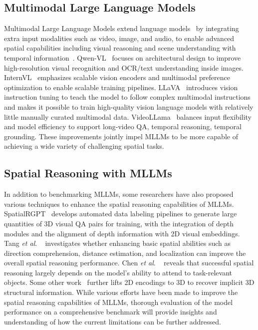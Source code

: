\documentclass{article}
\newcommand{\etal}{\textit{et al}. }
\begin{document}
\subsection{Multimodal Large Language Models}
Multimodal Large Language Models extend language models~\cite{gemini2023,llama2_2023} by integrating extra input modalities such as video, image, and audio, to enable advanced spatial capabilities including visual reasoning and scene understanding with temporal information~\cite{Alayrac2022Flamingo,chen2024internvl}.
Qwen-VL~\cite{bai2025qwen2,qwen3} focuses on architectural design to improve high-resolution visual recognition and OCR/text understanding inside images.
InternVL~\cite{wang2025internvl3,chen2024internvl} emphasizes scalable vision encoders and multimodal preference optimization to enable scalable training pipelines.
LLaVA~\cite{liu2023improvedllava} introduces vision instruction tuning to teach the model to follow complex multimodal instructions and makes it possible to train high-quality vision language models with relatively little manually curated multimodal data.
VideoLLama~\cite{zhang2025videollama} balances input flexibility and model efficiency to support long-video QA, temporal reasoning, temporal grounding.
These improvements jointly impel MLLMs to be more capable of achieving a wide variety of challenging spatial tasks.



\subsection{Spatial Reasoning with MLLMs}
In addition to benchmarking MLLMs, some researchers have also proposed various techniques to enhance the spatial reasoning capabilities of MLLMs.
SpatialRGPT~\cite{cheng2024spatialrgpt} develops automated data labeling pipelines to generate large quantities of 3D visual QA pairs for training, with the integration of depth modules and the alignment of depth information with 2D visual embeddings.
Tang \etal~\cite{tang2025sparkle} investigates whether enhancing basic spatial abilities such as direction comprehension, distance estimation, and localization can improve the overall spatial reasoning performance.
Chen \etal~\cite{chen2025spatial} reveals that successful spatial reasoning largely depends on the model's ability to attend to task-relevant objects.
Some other work~\cite{fan2025vlm,wu2025spatial,zhu2024llava} further lifts 2D encodings to 3D to recover implicit 3D structural information.
While various efforts have been made to improve the spatial reasoning capabilities of MLLMs, thorough evaluation of the model performance on a comprehensive benchmark will provide insights and understanding of how the current limitations can be further addressed.
\end{document}
